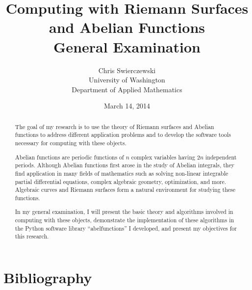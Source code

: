 \documentclass[10pt]{article}
\title{Computing with Riemann Surfaces and Abelian Functions \\ {\small
    General Examination}}
\author{
Chris Swierczewski\\
University of Washington\\
Department of Applied Mathematics}
\date{March 14, 2014}
\theoremstyle{definition}
\numberwithin{equation}{section}
\numberwithin{figure}{section}
\begin{document}

\maketitle

\begin{abstract}
The goal of my research is to use the theory of Riemann surfaces and
Abelian functions to address different application problems and to
develop the software tools necessary for computing with these objects.

Abelian functions are periodic functions of $n$ complex variables having
$2n$ independent periods. Although Abelian functions first arose in the
study of Abelian integrals, they find application in many fields of
mathematics such as solving non-linear integrable partial differential
equations, complex algebraic geometry, optimization, and more. Algebraic
curves and Riemann surfaces form a natural environment for studying
these functions.

In my general examination, I will present the basic theory and
algorithms involved in computing with these objects, demonstrate the
implementation of these algorithms in the Python software library
``abelfunctions'' I developed, and present my objectives for this
research.
\end{abstract}






\section{Bibliography}






\end{document}
